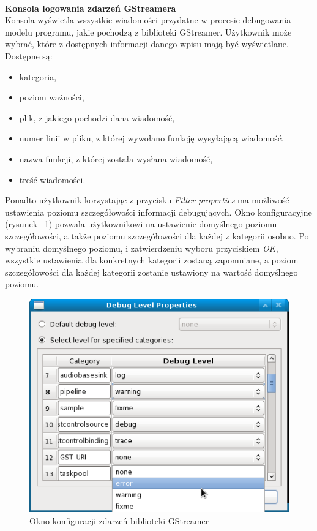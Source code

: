 \documentclass[12pt]{article}
\begin{document}
\paragraph{}\vspace{-3mm}
\textbf{Konsola logowania zdarzeń GStreamera} \\
Konsola wyświetla wszystkie wiadomości przydatne w procesie debugowania modelu programu, jakie pochodzą z biblioteki GStreamer. Użytkownik może wybrać, które z dostępnych informacji danego wpisu mają być wyświetlane. Dostępne są:
\begin{itemize}
 \setlength{\itemsep}{0em}
\item kategoria,
\item poziom ważności,
\item plik, z jakiego pochodzi dana wiadomość,
\item numer linii w pliku, z której wywołano funkcję wysyłającą wiadomość,
\item nazwa funkcji, z której została wysłana wiadomość,
\item treść wiadomości.
\end{itemize}
Ponadto użytkownik korzystając z przycisku \textit{Filter properties} ma możliwość ustawienia poziomu szczegółowości informacji debugujących. Okno konfiguracyjne (rysunek ~\ref{fig:debugLevelProperties}) pozwala użytkownikowi na ustawienie domyślnego poziomu szczegółowości, a także poziomu szczegółowości dla każdej z kategorii osobno. Po wybraniu domyślnego poziomu, i zatwierdzeniu wyboru przyciskiem \textit{OK}, wszystkie ustawienia dla konkretnych kategorii zostaną zapomniane, a poziom szczegółowości dla każdej kategorii zostanie ustawiony na wartość domyślnego poziomu.
\begin{figure}[H]
  \includegraphics[width=130mm]{img/debug-level-properties.png}
  \caption{Okno konfiguracji zdarzeń biblioteki GStreamer}
  \label{fig:debugLevelProperties}
\end{figure}
\end{document}
